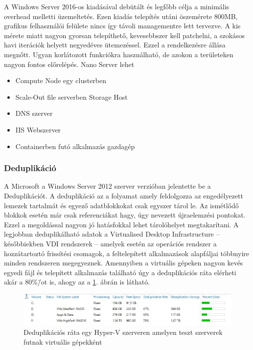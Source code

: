\documentclass[12pt,oneside,justify,table]{book}
\begin{document}
A Windows Server 2016-os kiadásával debütált és legfőbb célja a minimális overhead melletti üzemeltetés. 
Ezen kiadás telepítés utáni öszemérete 800MB, grafikus felhasználói felülete nincs így távoli managementre lett tervezve.
A kis mérete miatt nagyon gyorsan telepíthető, kevesebbszer kell patchelni, a szokásos havi iterációk helyett negyedéves ütemezéssel. 
Ezzel a rendelkezésre állása megnőtt. 
Ugyan korlátozott funkciókra használható, de azokon a területeken nagyon fontos előrelépés. 
Nano Server lehet 
\begin{itemize}
	\item Compute Node egy clusterben
	\item Scale-Out file serverben Storage Host
	\item DNS szerver
	\item IIS Webszerver
	\item Containerben futó alkalmazás gazdagép
\end{itemize}

\subsubsection{Deduplikáció}

A Microsoft a Windows Server 2012 szerver verzióban jelentette be a Deduplikációt. 
A deduplikáció az a folyamat amely feldolgozza az engedélyezett lemezek tartalmát és egyező adatblokkokat csak egyszer tárol le. Az ismétlődő blokkok esetén már csak referenciákat hagy, úgy nevezett újraelemzési pontokat. 
Ezzel a megoldással nagyon jó hatásfokkal lehet tárolóhelyet megtakarítani. 
A legjobban deduplikálható adatok a Virtualised Desktop Infrastructure -- későbbiekben VDI rendszerek -- amelyek esetén az operációs rendszer a hozzátartoztó frissítési csomagok, a feltelepített alkalmazások alapfáljai többnyire minden rendszeren megegyeznek. 
Amennyiben a virtuális gépeken nagyon kevés egyedi fájl és telepített alkalmazás található úgy a deduplikációs ráta elérheti akár a 80\%\=/ot is, ahogy az a \ref{fig:deduplication_ratio}. ábrán is látható.

\begin{figure}
\centering
\includegraphics[width=1\textwidth]{deduplication-ratio-sample}
\caption{Deduplikációs ráta egy Hyper-V szerveren amelyen teszt szerverek futnak virtuális gépekként}
\label{fig:deduplication_ratio}
\end{figure}
\end{document}
